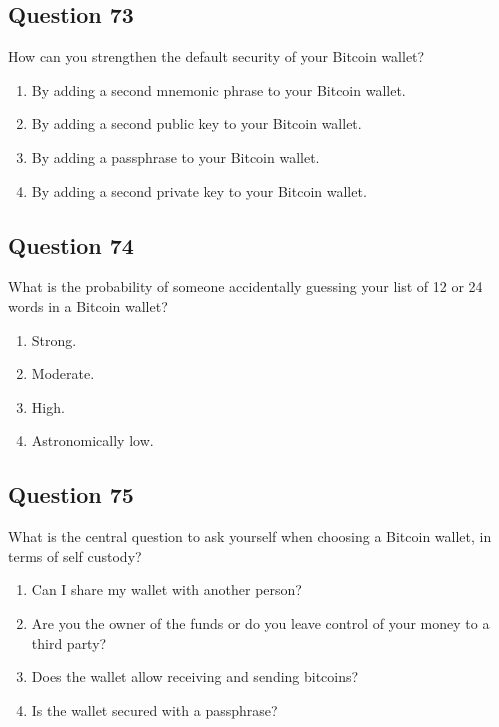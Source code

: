 \documentclass[12pt,a4paper]{article}
\begin{document}
\bigskip


\subsection*{Question 73}
How can you strengthen the default security of your Bitcoin wallet?

\begin{enumerate}[label=\Alph*., leftmargin=*]
\item By adding a second mnemonic phrase to your Bitcoin wallet.
\item By adding a second public key to your Bitcoin wallet.
\item By adding a passphrase to your Bitcoin wallet.
\item By adding a second private key to your Bitcoin wallet.
\end{enumerate}

\bigskip


\subsection*{Question 74}
What is the probability of someone accidentally guessing your list of 12 or 24 words in a Bitcoin wallet?

\begin{enumerate}[label=\Alph*., leftmargin=*]
\item Strong.
\item Moderate.
\item High.
\item Astronomically low.
\end{enumerate}

\bigskip


\subsection*{Question 75}
What is the central question to ask yourself when choosing a Bitcoin wallet, in terms of self custody?

\begin{enumerate}[label=\Alph*., leftmargin=*]
\item Can I share my wallet with another person?
\item Are you the owner of the funds or do you leave control of your money to a third party?
\item Does the wallet allow receiving and sending bitcoins?
\item Is the wallet secured with a passphrase?
\end{enumerate}
\end{document}
